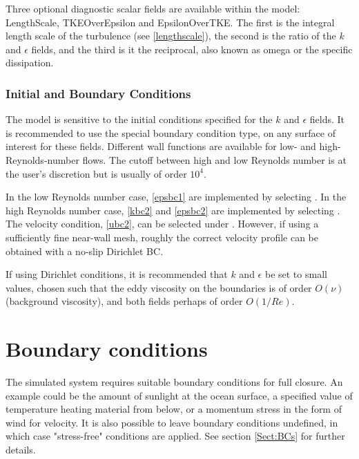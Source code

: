 Three optional diagnostic scalar fields are available within the model: LengthScale, TKEOverEpsilon and EpsilonOverTKE. The first is the integral length scale of the turbulence (see \eqref{lengthscale}), the second is the ratio of the $k$ and $\epsilon$ fields, and the third is it the reciprocal, also known as omega or the specific dissipation.

\subsubsection{Initial and Boundary Conditions}

The model is sensitive to the initial conditions specified for the $k$ and $\epsilon$ fields. It is recommended to use the special boundary condition type,  on any surface of interest for these fields. Different wall functions are available for low- and high-Reynolds-number flows. The cutoff between high and low Reynolds number is at the user's discretion but is usually of order $10^4$.

In the low Reynolds number case, \eqref{epsbc1} are implemented by selecting . In the high Reynolds number case, \eqref{kbc2} and \eqref{epsbc2} are implemented by selecting . The velocity condition, \eqref{ubc2}, can be selected under \linebreak
{}.
However, if using a sufficiently fine near-wall mesh, roughly the correct velocity profile can be obtained with a no-slip Dirichlet BC.

If using Dirichlet conditions, it is recommended that $k$ and $\epsilon$ be set to small values, chosen such that the eddy viscosity on the boundaries is of order $O(\nu)$ (background viscosity), and both fields perhaps of order $O(1/Re)$.

\section{Boundary conditions}\label{Sect:BCs_configure}

The simulated system requires suitable boundary conditions for full closure.
An example could be the amount of sunlight at the ocean surface, a specified value of
temperature heating material from below, or a momentum stress in the form of wind for velocity.
It is also possible to leave boundary conditions undefined, in which case "stress-free" conditions are
applied. See section \ref{Sect:BCs} for further details.

